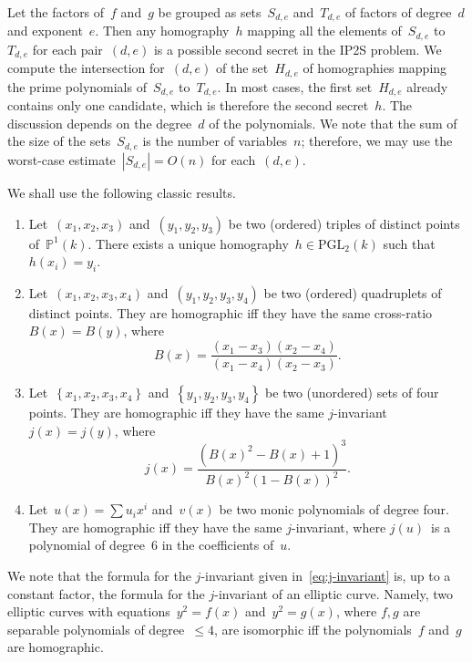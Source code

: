 \documentclass{lms}%
\def\acco#1{\left\{#1\right\}}
\def\abs#1{\left|#1\right|}
\def\card#1{\abs{#1}}
\begin{document}
Let the factors of~$f$ and~$g$ be grouped as sets~$S_{d,e}$ and~$T_{d,e}$
of factors of degree~$d$ and exponent~$e$. Then any homography~$h$
mapping all the elements of~$S_{d,e}$ to~$T_{d,e}$ for each pair~$(d,e)$
is a possible second secret in the IP2S problem. We compute the
intersection for~$(d,e)$ of the set~$H_{d,e}$ of homographies mapping the
prime polynomials of~$S_{d,e}$ to~$T_{d,e}$. In most cases, the first
set~$H_{d,e}$ already contains only one candidate, which is therefore the
second secret~$h$. The discussion depends on the degree~$d$ of the
polynomials. We note that the sum of the size of the sets~$S_{d,e}$ is
the number of variables~$n$; therefore, we may use the worst-case
estimate~$\card{S_{d,e}} = O(n)$ for each~$(d,e)$.

We shall use the following classic results.
\begin{prop}\label{prop:homography}
\begin{enumerate}
\item Let~$(x_1, x_2, x_3)$ and~$(y_1, y_2, y_3)$ be two (ordered)
triples of distinct points of~$ℙ^1(k)$. There exists a unique
homography~$h ∈ \mathrm{PGL}_2(k)$ such that~$h(x_i) = y_i$.
\item Let~$(x_1, x_2, x_3, x_4)$ and~$(y_1, y_2, y_3, y_4)$ be two
(ordered) quadruplets of distinct points. They are homographic iff they
have the same cross-ratio~$B(x) = B(y)$, where
\begin{equation}
B(x) = \frac{(x_1-x_3)(x_2-x_4)}{(x_1-x_4)(x_2-x_3)}.
\end{equation}
\item Let~$\acco{x_1, x_2, x_3, x_4}$ and~$\acco{y_1, y_2, y_3, y_4}$ be
two (unordered) sets of four points. They are homographic iff they have
the same $j$-invariant~$j(x) = j(y)$, where
\begin{equation}\label{eq:j-invariant}
j(x) = \frac{(B(x)^2-B(x)+1)^3}{B(x)^2(1-B(x))^2}.
\end{equation}
\item Let~$u(x) = ∑ u_i x^i$ and~$v(x)$ be two monic polynomials
of degree four. They are homographic iff they have the same $j$-invariant,
where $j(u)$~is a polynomial of degree~$6$ in the coefficients of~$u$.
\end{enumerate}
\end{prop}

We note that the formula for the $j$-invariant given
in~\eqref{eq:j-invariant} is, up to a constant factor, the formula for
the $j$-invariant of an elliptic curve. Namely, two elliptic curves with
equations~$y^2 = f(x)$ and~$y^2 = g(x)$, where $f, g$ are separable
polynomials of degree~$≤ 4$, are isomorphic iff the polynomials~$f$
and~$g$ are homographic.
\end{document}
